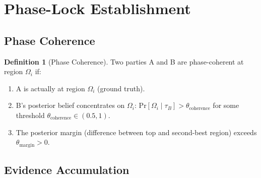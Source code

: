 \documentclass[11pt,a4paper]{article}
\theoremstyle{definition}
\newtheorem{definition}{Definition}[section]
\newcommand{\pr}[1]{\mathrm{Pr}\left[#1\right]}
\newcommand{\given}{\mid}
\begin{document}
\section{Phase-Lock Establishment}
\label{sec:phase-lock}

\subsection{Phase Coherence}

\begin{definition}[Phase Coherence]
Two parties A and B are phase-coherent at region $\Omega_i$ if:
\begin{enumerate}
\item A is actually at region $\Omega_i$ (ground truth).
\item B's posterior belief concentrates on $\Omega_i$: $\pr{\Omega_i \given \tau_B} > \theta_{\text{coherence}}$ for some threshold $\theta_{\text{coherence}} \in (0.5, 1)$.
\item The posterior margin (difference between top and second-best region) exceeds $\theta_{\text{margin}} > 0$.
\end{enumerate}
\end{definition}

\subsection{Evidence Accumulation}
\end{document}
